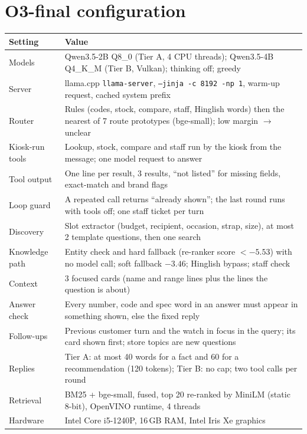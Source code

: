 \documentclass[11pt,a4paper]{article}
\begin{document}
\section{O3-final configuration}\label{app:config}
\begin{small}
\begin{tabularx}{\textwidth}{l L}
\toprule
Setting & Value \\
\midrule
Models & Qwen3.5-2B Q8\_0 (Tier A, 4 CPU threads); Qwen3.5-4B Q4\_K\_M (Tier B, Vulkan); thinking off; greedy \\
Server & llama.cpp \texttt{llama-server}, \texttt{--jinja -c 8192 -np 1}, warm-up request, cached system prefix \\
Router & Rules (codes, stock, compare, staff, Hinglish words) then the nearest of 7 route prototypes (bge-small); low
margin $\to$ unclear \\
Kiosk-run tools & Lookup, stock, compare and staff run by the kiosk from the message; one model request to answer \\
Tool output & One line per result, 3 results, ``not listed'' for missing fields, exact-match and brand flags \\
Loop guard & A repeated call returns ``already shown''; the last round runs with tools off; one staff ticket per turn \\
Discovery & Slot extractor (budget, recipient, occasion, strap, size), at most 2 template questions, then one search \\
Knowledge path & Entity check and hard fallback (re-ranker score $< -5.53$) with no model call; soft fallback
$-3.46$; Hinglish bypass; staff check \\
Context & 3 focused cards (name and range lines plus the lines the question is about) \\
Answer check & Every number, code and spec word in an answer must appear in something shown, else the fixed reply \\
Follow-ups & Previous customer turn and the watch in focus in the query; its card shown first; store topics are new
questions \\
Replies & Tier A: at most 40 words for a fact and 60 for a recommendation (120 tokens); Tier B: no cap; two tool calls
per round \\
Retrieval & BM25 + bge-small, fused, top 20 re-ranked by MiniLM (static 8-bit), OpenVINO runtime, 4 threads \\
Hardware & Intel Core i5-1240P, 16\,GB RAM, Intel Iris Xe graphics \\
\bottomrule
\end{tabularx}
\end{small}
\end{document}
